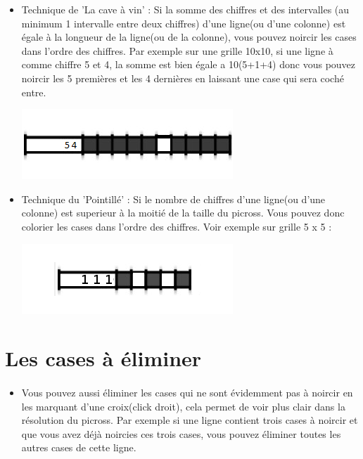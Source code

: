 \begin{itemize}
		\item Technique de 'La cave à vin' : Si la somme des chiffres et des intervalles (au minimum 1 intervalle entre deux chiffres) d'une ligne(ou d'une colonne) est égale à la longueur de la ligne(ou de la colonne), vous pouvez noircir les cases dans l'ordre des chiffres. Par exemple sur une grille 10x10, si une ligne à comme chiffre 5 et 4, la somme est bien égale a 10(5+1+4) donc vous pouvez noircir les 5 premières et les 4 dernières en laissant une case qui sera coché entre.\\
		
	\begin{center}
		\includegraphics{data/manuels/sommeChiffreInterv.png}
	\end{center}
	
		\item Technique du 'Pointillé' : Si le nombre de chiffres d'une ligne(ou d'une colonne) est superieur à la moitié de la taille du picross. Vous pouvez donc colorier les cases dans l'ordre des chiffres. Voir exemple sur grille 5 x 5 :
		
	\begin{center}
		\includegraphics{data/manuels/pointille.png}
	\end{center} 
	
	
	\end{itemize}

\section{Les cases à éliminer}
	\paragraph{}
	\begin{itemize}
		\item Vous pouvez aussi éliminer les cases qui ne sont évidemment pas à noircir en les marquant d'une croix(click droit), cela permet de voir plus clair dans la résolution du picross. Par exemple si une ligne contient trois cases à noircir et que vous avez déjà noircies ces trois cases, vous pouvez éliminer toutes les autres cases de cette ligne.
	\end{itemize}


